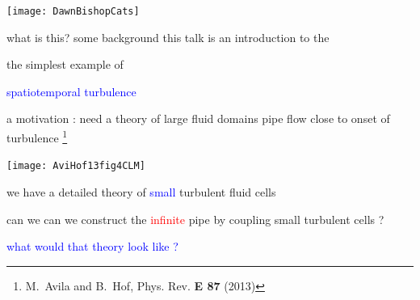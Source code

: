\begin{frame}{} %
\begin{center}
\hfill\texttt{[image: DawnBishopCats]}
\end{center}
\end{frame}

\begin{frame}
  \titlepage
\end{frame}


%

\begin{frame}{what is this? some background}
this talk is an introduction to the

\begin{center}
    {\textcolor{blue}{\catlatt}}
\end{center}

the simplest example of %

\bigskip
\begin{center}
 \textcolor{blue}{spatiotemporal turbulence}
\end{center}

\end{frame}


\begin{frame}{a motivation : need a theory of {\Huge large} fluid domains}
pipe flow close to onset of turbulence
\footnote{M.~Avila and B.~Hof, {Phys. Rev. \bf E 87} (2013)}
\begin{center}
\texttt{[image: AviHof13fig4CLM]}
\end{center}
we have a detailed theory of {\small \textcolor{blue}{small}} turbulent fluid cells

\bigskip

can we can we construct the \textcolor{red}{infinite} pipe by coupling small turbulent cells ?
\bigskip

\textcolor{blue}{what would that theory look like ?}
\end{frame}


